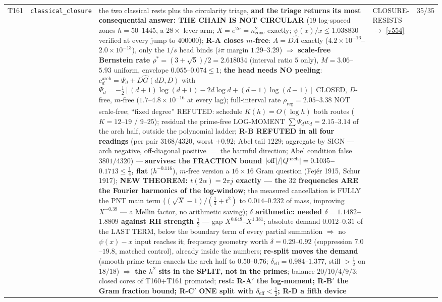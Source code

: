 \documentclass[11pt,a4paper]{article}
\begin{document}
{\begin{xltabular}{\linewidth}{@{}p{0.95cm} >{\raggedright\arraybackslash}p{3.1cm} Y >{\raggedright\scriptsize\arraybackslash}p{3.35cm} p{1.15cm}@{}}
T161 & \texttt{\scriptsize classical\_\allowbreak closure} & the two classical rests plus the circularity triage, \textbf{and the triage returns its most consequential answer: THE CHAIN IS NOT CIRCULAR} ($19$ log-spaced zones $h=50$--$1445$, a $28\times$ lever arm; $X=e^{2\alpha}=n_{\mathrm{zone}}^2$ exactly; $\psi(x)/x\le1.038830$ verified at every jump to $400000$); \textbf{R-A closes $m$-free}: $A=D\widehat A$ exactly ($4.2\times10^{-16}$--$2.0\times10^{-13}$), only the $1/s$ head binds ($i\pi$ margin $1.29$--$3.29$) $\Rightarrow$ \textbf{scale-free Bernstein rate $\rho^*=(3+\sqrt5)/2=2.618034$} (interval ratio $5$ only), $M=3.06$--$5.93$ uniform, envelope $0.055$--$0.074\le1$; \textbf{the head needs NO peeling}: $c^{\mathrm{arch}}_d=\Psi_d+D\widehat G(dD,D)$ with $\Psi_d=-\tfrac12[(d{+}1)\log(d{+}1)-2d\log d+(d{-}1)\log(d{-}1)]$ CLOSED, $D$-free, $m$-free ($1.7$--$4.8\times10^{-16}$ at every lag); full-interval rate $\rho_{\mathrm{reg}}=2.05$--$3.38$ NOT scale-free; ``fixed degree'' REFUTED: schedule $K(h)=O(\log h)$ both routes ($K=12$--$19$ / $9$--$25$); residual the prime-free LOG-MOMENT $\sum\Psi_dw_d=2.15$--$3.14$ of the arch half, outside the polynomial ladder; \textbf{R-B REFUTED in all four readings} (per pair $3168/4320$, worst $+0.92$; Abel tail $1229$; aggregate by SIGN --- arch negative, off-diagonal positive $=$ the harmful direction; Abel condition false $3801/4320$) --- \textbf{survives: the FRACTION bound $|{\rm off}|/|Q^{\mathrm{arch}}|=0.1035$--$0.1713\le\tfrac14$, flat} ($h^{-0.116}$), $m$-free version a $16\times16$ Gram question (Fej\'er 1915, Schur 1917); \textbf{NEW THEOREM: $t(2\alpha)=2\pi j$ exactly --- the $32$ frequencies ARE the Fourier harmonics of the log-window}; the measured cancellation is FULLY the PNT main term ($(\sqrt X-1)/(\tfrac14+t^2)$ to $0.014$--$0.232$ of mass, improving $X^{-0.39}$ --- a Mellin factor, no arithmetic saving); \textbf{$\delta$ arithmetic: needed $\delta=1.1482$--$1.8809$ against RH strength $\tfrac12$} --- gap $X^{0.648}$--$X^{1.381}$; absolute demand $0.012$--$0.31$ of the LAST TERM, below the boundary term of every partial summation $\Rightarrow$ no $\psi(x)-x$ input reaches it; frequency geometry worth $\delta=0.29$--$0.92$ (suppression $7.0$--$19.8$, matched control), already inside the numbers; \textbf{re-split moves the demand} (smooth prime term cancels the arch half to $0.50$--$0.76$; $\delta_{\mathrm{eff}}=0.984$--$1.377$, still $>\tfrac12$ on $18/18$) $\Rightarrow$ \textbf{the $h^2$ sits in the SPLIT, not in the primes}; balance $20/10/4/9/3$; closed cores of T160+T161 promoted; \textbf{rest: R-A$'$ the log-moment; R-B$'$ the Gram fraction bound; R-C$'$ ONE split with $\delta_{\mathrm{eff}}<\tfrac12$; R-D a fifth device} & CLOSURE-RESISTS $\to$ \vref{v554} & 35/35\\

\end{xltabular}}
\end{document}
